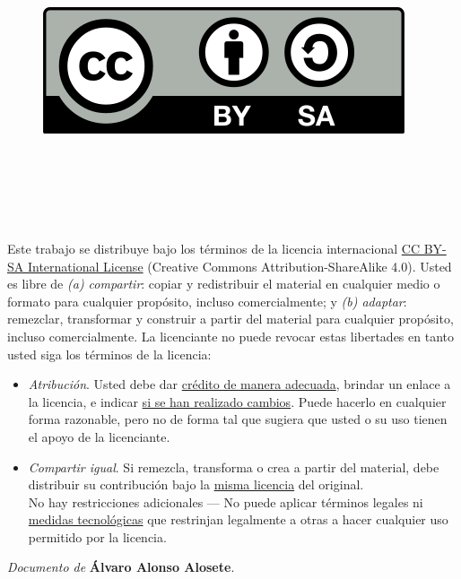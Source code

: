 
\cleardoublepage

\begin{flushright}
\begin{figure}
 \ \ \ \ \includegraphics[width=0.25\linewidth,right]{figs/by-sa.png}
 \label{fig:cc} 
 \end{figure}
\end{flushright}

\

\

\

\noindent
Este trabajo se distribuye bajo los términos de la licencia internacional \href{http://creativecommons.org/licenses/by-sa/4.0/}{CC BY-SA International License} (Creative Commons Attribution-ShareAlike 4.0). Usted es libre de \textit{(a) compartir}: copiar y redistribuir el material en cualquier medio o formato para cualquier propósito, incluso comercialmente; y \textit{(b) adaptar}: remezclar, transformar y construir a partir del material para cualquier propósito, incluso comercialmente. La licenciante no puede revocar estas libertades en tanto usted siga los términos de la licencia:

\begin{itemize}
\item \textit{Atribución}. Usted debe dar \href{https://creativecommons.org/licenses/by-sa/4.0/deed.es#ref-appropriate-credit}{crédito de manera adecuada}, brindar un enlace a la licencia, e indicar \href{https://creativecommons.org/licenses/by-sa/4.0/deed.es#ref-indicate-changes}{si se han realizado cambios}. Puede hacerlo en cualquier forma razonable, pero no de forma tal que sugiera que usted o su uso tienen el apoyo de la licenciante.
\item \textit{Compartir igual}. Si remezcla, transforma o crea a partir del material, debe distribuir su contribución bajo la \href{https://creativecommons.org/licenses/by-sa/4.0/deed.es#ref-same-license}{misma licencia} del original.\\
No hay restricciones adicionales — No puede aplicar términos legales ni \href{https://creativecommons.org/licenses/by-sa/4.0/deed.es#ref-technological-measures}{medidas tecnológicas} que restrinjan legalmente a otras a hacer cualquier uso permitido por la licencia.
\end{itemize}

\begin{flushright}
		\vspace{7.0 cm}
		\emph{Documento de} \textbf{Álvaro Alonso Alosete}. %
\end{flushright}

